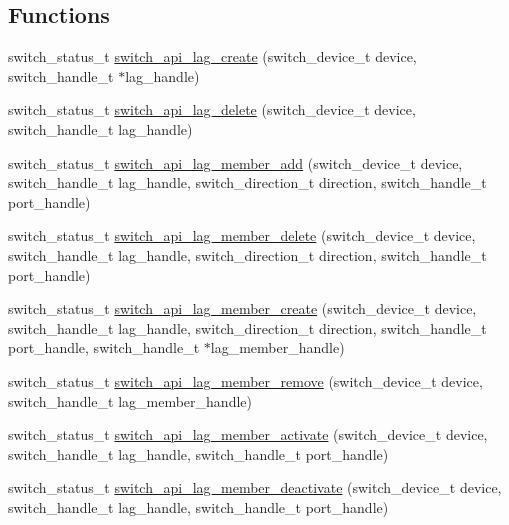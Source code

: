 \subsection*{Functions}
\begin{DoxyCompactItemize}
\item 
switch\+\_\+status\+\_\+t \hyperlink{group__LAG_gaf33247bb02d1f361c6baf76f6d34dacb}{switch\+\_\+api\+\_\+lag\+\_\+create} (switch\+\_\+device\+\_\+t device, switch\+\_\+handle\+\_\+t $\ast$lag\+\_\+handle)
\item 
switch\+\_\+status\+\_\+t \hyperlink{group__LAG_ga371ca16cc8dddfa20974036ba5db8dc3}{switch\+\_\+api\+\_\+lag\+\_\+delete} (switch\+\_\+device\+\_\+t device, switch\+\_\+handle\+\_\+t lag\+\_\+handle)
\item 
switch\+\_\+status\+\_\+t \hyperlink{group__LAG_gaa91eff2c7c4cd6ee25406c4db31f5089}{switch\+\_\+api\+\_\+lag\+\_\+member\+\_\+add} (switch\+\_\+device\+\_\+t device, switch\+\_\+handle\+\_\+t lag\+\_\+handle, switch\+\_\+direction\+\_\+t direction, switch\+\_\+handle\+\_\+t port\+\_\+handle)
\item 
switch\+\_\+status\+\_\+t \hyperlink{group__LAG_ga1ad65f21fbdeaa2f614649137b72c14c}{switch\+\_\+api\+\_\+lag\+\_\+member\+\_\+delete} (switch\+\_\+device\+\_\+t device, switch\+\_\+handle\+\_\+t lag\+\_\+handle, switch\+\_\+direction\+\_\+t direction, switch\+\_\+handle\+\_\+t port\+\_\+handle)
\item 
switch\+\_\+status\+\_\+t \hyperlink{group__LAG_gacc841c8a06785e5618ac608df807c7a3}{switch\+\_\+api\+\_\+lag\+\_\+member\+\_\+create} (switch\+\_\+device\+\_\+t device, switch\+\_\+handle\+\_\+t lag\+\_\+handle, switch\+\_\+direction\+\_\+t direction, switch\+\_\+handle\+\_\+t port\+\_\+handle, switch\+\_\+handle\+\_\+t $\ast$lag\+\_\+member\+\_\+handle)
\item 
switch\+\_\+status\+\_\+t \hyperlink{group__LAG_ga2da6e62e43f9806a0a6b9f9749497d5a}{switch\+\_\+api\+\_\+lag\+\_\+member\+\_\+remove} (switch\+\_\+device\+\_\+t device, switch\+\_\+handle\+\_\+t lag\+\_\+member\+\_\+handle)
\item 
switch\+\_\+status\+\_\+t \hyperlink{group__LAG_gaef3f5c788ff03c58ce4b51cbf6e2f064}{switch\+\_\+api\+\_\+lag\+\_\+member\+\_\+activate} (switch\+\_\+device\+\_\+t device, switch\+\_\+handle\+\_\+t lag\+\_\+handle, switch\+\_\+handle\+\_\+t port\+\_\+handle)
\item 
switch\+\_\+status\+\_\+t \hyperlink{group__LAG_ga5ba3c982fded544829a4b4f3c1b3ca88}{switch\+\_\+api\+\_\+lag\+\_\+member\+\_\+deactivate} (switch\+\_\+device\+\_\+t device, switch\+\_\+handle\+\_\+t lag\+\_\+handle, switch\+\_\+handle\+\_\+t port\+\_\+handle)

\end{DoxyCompactItemize}
